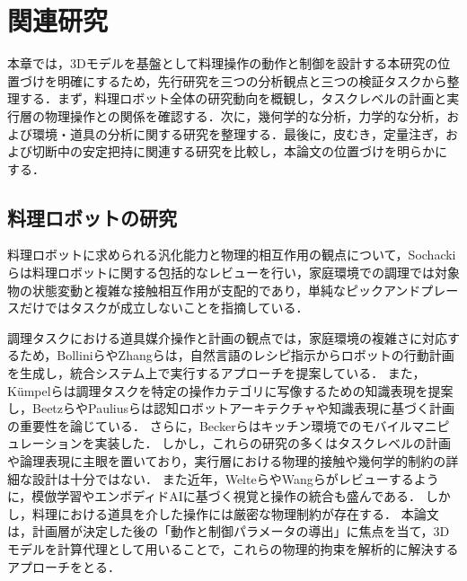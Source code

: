 \chapter{関連研究}
本章では，3Dモデルを基盤として料理操作の動作と制御を設計する本研究の位置づけを明確にするため，先行研究を三つの分析観点と三つの検証タスクから整理する．まず，料理ロボット全体の研究動向を概観し，タスクレベルの計画と実行層の物理操作との関係を確認する．次に，幾何学的な分析，力学的な分析，および環境・道具の分析に関する研究を整理する．最後に，皮むき，定量注ぎ，および切断中の安定把持に関連する研究を比較し，本論文の位置づけを明らかにする．

\section{料理ロボットの研究}
料理ロボットに求められる汎化能力と物理的相互作用の観点について，Sochackiら\cite{Sochacki2024PracticalChefReview}は料理ロボットに関する包括的なレビューを行い，家庭環境での調理では対象物の状態変動と複雑な接触相互作用が支配的であり，単純なピックアンドプレースだけではタスクが成立しないことを指摘している．

調理タスクにおける道具媒介操作と計画の観点では，家庭環境の複雑さに対応するため，Bolliniら\cite{Bollini2013RecipesCookingRobot}やZhangら\cite{Zhang2024RealWorldCookingFromRecipes}は，自然言語のレシピ指示からロボットの行動計画を生成し，統合システム上で実行するアプローチを提案している．
また，Kümpelら\cite{Kumpel2025CookingActions}は調理タスクを特定の操作カテゴリに写像するための知識表現を提案し，Beetzら\cite{Beetz2011CRAM}やPauliusら\cite{PauliusSun2019CookingSurvey}は認知ロボットアーキテクチャや知識表現に基づく計画の重要性を論じている．
さらに，Beckerら\cite{Becker2011KitchenContainers}はキッチン環境でのモバイルマニピュレーションを実装した．
しかし，これらの研究の多くはタスクレベルの計画や論理表現に主眼を置いており，実行層における物理的接触や幾何学的制約の詳細な設計は十分ではない．
また近年，Welteら\cite{Welte2025DexterousILSurvey}やWangら\cite{Wang2025EmbodiedVisualPerceptionSurvey}がレビューするように，模倣学習やエンボディドAIに基づく視覚と操作の統合も盛んである．
しかし，料理における道具を介した操作には厳密な物理制約が存在する．
本論文は，計画層が決定した後の「動作と制御パラメータの導出」に焦点を当て，3Dモデルを計算代理として用いることで，これらの物理的拘束を解析的に解決するアプローチをとる．

